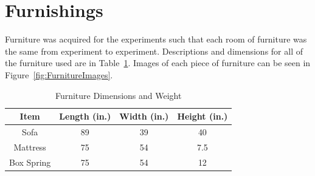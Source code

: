 \documentclass[12pt,oneside]{book}
\begin{document}
\section{Furnishings}

Furniture was acquired for the experiments such that each room of furniture was the same from experiment to experiment. Descriptions and dimensions for all of the furniture used are in Table~\ref{FurnitureTable}. Images of each piece of furniture can be seen in Figure~\ref{fig:FurnitureImages}.

\renewcommand{\arraystretch}{1.5}
\begin{table}[H]
	\centering
	\caption{Furniture Dimensions and Weight}
		\begin{tabular}[c]{|c|c|c|c|}
			\hline
			\textbf{Item} & \textbf{Length (in.)} & \textbf{Width (in.)} & \textbf{Height (in.)} \\ \hline \hline
			Sofa & 89 & 39 & 40 \\ \hline
			Mattress & 75 & 54 & 7.5 \\ \hline
			Box Spring & 75 & 54 & 12 \\ \hline
		\end{tabular}
	\label{FurnitureTable}
\end{table}

\end{document}

